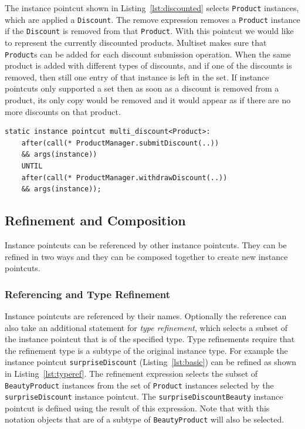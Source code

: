\documentclass{acm_proc_article-sp}
\newcommand{\lstinln}[1]{\lstinline~#1~}
\begin{document}
The instance pointcut shown in Listing~\ref{lst:discounted} selects \lstinln{Product} instances, which are applied a \lstinln{Discount}. The remove expression removes a \lstinln{Product} instance if the \lstinln{Discount} is removed from that \lstinln{Product}. With this pointcut we would like to represent the currently discounted products. Multiset makes sure that \lstinln{Product}s can be added for each discount submission operation. When the same product is added with different types of discounts, and if one of the discounts is removed, then still one entry of that instance is left in the set.  If instance pointcuts only supported a set then as soon as a discount is removed from a product, its only copy would be removed and it would appear as if there are no more discounts on that product. 

\begin{lstlisting}[float=h!, caption={An instance pointcut utilizing multiset property}, label={lst:discounted}]
static instance pointcut multi_discount<Product>: 
	after(call(* ProductManager.submitDiscount(..)) 
	&& args(instance)) 
	UNTIL 
	after(call(* ProductManager.withdrawDiscount(..)) 
	&& args(instance));
\end{lstlisting}


\subsection{Refinement and Composition}

Instance pointcuts can be referenced by other instance pointcuts. They can be refined in two ways and they can be composed together to create new instance pointcuts. 

\subsubsection{Referencing and Type Refinement}
\label{sect:typeref}
Instance pointcuts are referenced by their names. Optionally the reference can also take an additional statement for \emph{type refinement}, which selects a subset of the instance pointcut that is of the specified type. Type refinements require that the refinement type is a subtype of the original instance type. For example the instance pointcut \lstinln{surpriseDiscount} (Listing~\ref{lst:basic}) can be refined as shown in Listing~\ref{lst:typeref}. The refinement expression selects the subset of \lstinln{BeautyProduct} instances from the set of \lstinln{Product} instances selected by the \lstinln{surpriseDiscount} instance pointcut. The \lstinln{surpriseDiscountBeauty} instance pointcut is defined using the result of this expression. Note that with this notation objects that are of a subtype of \lstinln{BeautyProduct} will also be selected. 
\end{document}
